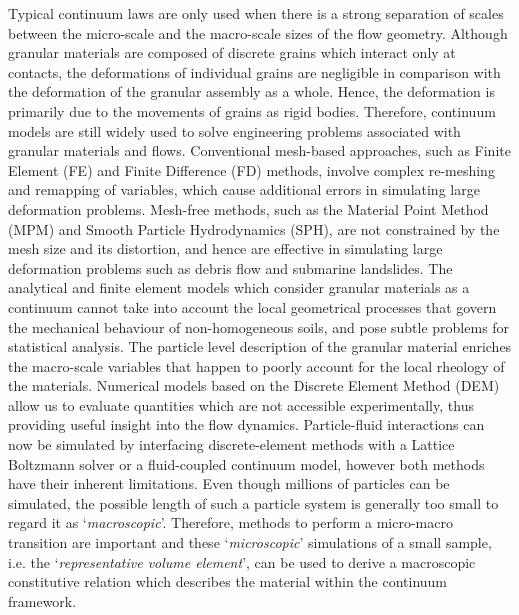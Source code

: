 Typical continuum laws are only used when there is a strong separation of 
scales between the micro-scale and the macro-scale sizes of the flow geometry. 
Although granular materials are composed of discrete grains which interact only 
at contacts, the deformations of individual grains are negligible in comparison 
with the deformation of the granular assembly as a whole. Hence, the 
deformation is primarily due to the movements of grains as rigid bodies. 
Therefore, continuum models are still widely used to solve engineering problems 
associated with granular materials and flows. Conventional mesh-based 
approaches, such as Finite Element (FE) and Finite Difference (FD) methods, 
involve complex re-meshing and remapping of variables, which cause additional 
errors in simulating large deformation problems. Mesh-free methods, such as the 
Material Point Method (MPM) and Smooth Particle Hydrodynamics (SPH), are not 
constrained by the mesh size and its distortion, and hence are effective in 
simulating large deformation problems such as debris flow and submarine 
landslides. The analytical and finite element models which consider granular 
materials as a continuum cannot take into account the local geometrical 
processes that govern the mechanical behaviour of non-homogeneous soils, and 
pose subtle problems for statistical analysis. The particle level description 
of the granular material enriches the macro-scale variables that happen to 
poorly account for the local rheology of the materials. Numerical models based 
on the Discrete Element Method (DEM) allow us to evaluate quantities which are 
not accessible experimentally, thus providing useful insight into the flow 
dynamics. Particle-fluid interactions can now be simulated by interfacing 
discrete-element methods with a Lattice Boltzmann solver or a fluid-coupled 
continuum model, however both methods have their inherent limitations. Even 
though millions of particles can be simulated, the possible length of such a 
particle system is generally too small to regard it as `\textit{macroscopic}'. 
Therefore, methods to perform a micro-macro transition are important and these 
`\textit{microscopic}' simulations of a small sample, i.e. the 
`\textit{representative volume element}', can be used to derive a macroscopic 
constitutive relation which describes the material within the continuum 
framework. 

